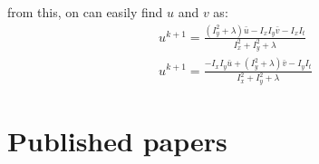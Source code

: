 from this, on can easily find $u$ and $v$ as:
\begin{equation} \label{JEq}
\begin{split}
u^{k+1} = \frac{(I_{y}^2+\lambda)\bar{u}
	-I_{x}I_{y}\bar{v}
	-I_{x}I_{t}}{I_{x}^2+I_{y}^2+ \lambda}
\\
u^{k+1} = \frac{-I_{x}I_{y}\bar{u}
	+(I_{y}^2+\lambda)\bar{v}
	-I_{y}I_{t}}{I_{x}^2+I_{y}^2+ \lambda}
\end{split}
\end{equation}


\chapter{Published papers}